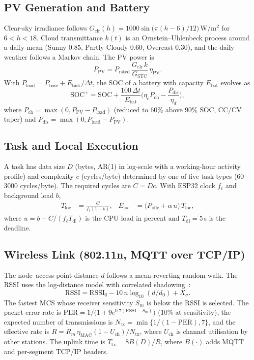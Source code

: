 \documentclass[conference]{IEEEtran}
\begin{document}
\subsection{PV Generation and Battery}
Clear-sky irradiance follows $G_{\mathrm{clr}}(h)=1000\sin\!\big(\pi(h-6)/12\big)$\,W/m$^2$ for $6<h<18$. Cloud transmittance
$k(t)$ is an Ornstein--Uhlenbeck process around a daily mean (Sunny 0.85, Partly Cloudy 0.60, Overcast 0.30), and the daily weather
follows a Markov chain. The PV power is
\begin{equation}
P_{\mathrm{PV}} = P_{\mathrm{rated}}\,\frac{G_{\mathrm{clr}}\,k}{G_{\mathrm{STC}}}\,\eta_{\mathrm{PV}} .
\end{equation}
With $P_{\mathrm{load}} = P_{\mathrm{base}} + E_{\mathrm{task}}/\Delta t$, the SOC of a battery with capacity $E_{\mathrm{bat}}$ evolves as
\begin{equation}
\mathrm{SOC}^{+} = \mathrm{SOC} + \frac{100\,\Delta t}{E_{\mathrm{bat}}}
\Big(\eta_c P_{\mathrm{ch}} - \frac{P_{\mathrm{dis}}}{\eta_d}\Big),
\end{equation}
where $P_{\mathrm{ch}}=\max(0,P_{\mathrm{PV}}-P_{\mathrm{load}})$ (reduced to 60\% above 90\% SOC, CC/CV taper) and
$P_{\mathrm{dis}}=\max(0,P_{\mathrm{load}}-P_{\mathrm{PV}})$.

\subsection{Task and Local Execution}
A task has data size $D$ (bytes, AR(1) in log-scale with a working-hour activity profile) and complexity $c$ (cycles/byte)
determined by one of five task types (60--3000 cycles/byte). The required cycles are $C=Dc$. With ESP32 clock $f_{\ell}$ and
background load $b$,
\begin{align}
T_{\mathrm{loc}} &= \frac{C}{f_{\ell}(1-b)}, &
E_{\mathrm{loc}} &= \big(P_{\mathrm{idle}}+\alpha\,u\big)\,T_{\mathrm{loc}},
\end{align}
where $u = b + C/(f_{\ell}T_{\mathrm{dl}})$ is the CPU load in percent and $T_{\mathrm{dl}}=5$\,s is the deadline.

\subsection{Wireless Link (802.11n, MQTT over TCP/IP)}
The node--access-point distance $d$ follows a mean-reverting random walk. The RSSI uses the log-distance model with correlated
shadowing~\cite{rappaport2002wireless,gudmundson1991correlation}:
\begin{equation}
\mathrm{RSSI} = \mathrm{RSSI}_0 - 10\,n\log_{10}(d/d_0) + X_\sigma .
\end{equation}
The fastest MCS whose receiver sensitivity $S_m$ is below the RSSI is selected. The packet error rate is
$\mathrm{PER}=1/\big(1+9e^{0.7(\mathrm{RSSI}-S_m)}\big)$ (10\% at sensitivity), the expected number of transmissions is
$N_{\mathrm{tx}}=\min\{1/(1-\mathrm{PER}),7\}$, and the effective rate is $R=R_m\,\eta_{\mathrm{MAC}}(1-U_{\mathrm{ch}})/N_{\mathrm{tx}}$,
where $U_{\mathrm{ch}}$ is channel utilisation by other stations. The uplink time is $T_{\mathrm{tx}}=8B(D)/R$, where $B(\cdot)$ adds
MQTT and per-segment TCP/IP headers.
\end{document}
